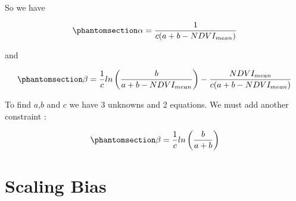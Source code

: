 \documentclass[
  letterpaper,
  DIV=11,
  numbers=noendperiod]{scrartcl}
\begin{document}
So we have

\begin{equation}\phantomsection\label{eq-alinear}{
\alpha = \frac{1}{c(a+b-NDVI_{mean})}
}\end{equation}

and

\begin{equation}\phantomsection\label{eq-blinear}{
\beta = \frac{1}{c}ln\left(\frac{b}{a+b-NDVI_{mean}}\right)-\frac{NDVI_{mean}}{c(a+b-NDVI_{mean})}
}\end{equation}

To find \(a\),\(b\) and \(c\) we have 3 unknowns and 2 equations. We
must add another constraint :

\begin{equation}\phantomsection\label{eq-betaNDVInull}{
\beta = \frac{1}{c}ln\left(\frac{b}{a+b}\right)
}\end{equation}

\section{Scaling Bias}\label{scaling-bias}
\end{document}
